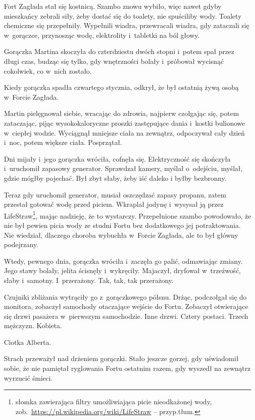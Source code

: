 \documentclass[oneside,polish,11pt,sfheadings]{mwbk}
\begin{document}
Fort Zagłada stał się kostnicą. Szambo znowu wybiło, więc nawet gdyby
mieszkańcy zebrali siły, żeby dostać się do toalety, nie spuściliby
wody. Toalety chemiczne się przepełniły. Wypełnili wiadra, przewracali
wiadra, gdy zataczali się w~gorączce, przynosząc wodę, elektrolity i~tabletki na ból głowy.

Gorączka Martina skoczyła do czterdziestu dwóch stopni i~potem spał przez długi
czas, budząc się tylko, gdy wnętrzności bolały i~próbował wycisnąć
cokolwiek, co w~nich zostało.

Kiedy gorączka spadła czwartego stycznia, odkrył, że był ostatnią żywą
osobą w~Forcie Zagłada.

Martin pielęgnował siebie, wracając do zdrowia, najpierw czołgając się,
potem zataczając, pijąc wysokokaloryczne proszki zastępujące dania i~kostki bulionowe w~ciepłej wodzie. Wyciągnął mniejsze ciała na zewnątrz,
odpoczywał cały dzień i~noc, potem większe ciała. Posprzątał.

Dni mijały i~jego gorączka wróciła, cofnęła się. Elektryczność się
skończyła i~uruchomił zapasowy generator. Sprawdzał kamery, myślał o~odejściu, myślał, gdzie mógłby pojechać. Był zbyt słaby, żeby iść daleko
i byłby bezbronny.

Teraz gdy uruchomił generator, musiał oszczędzać zapasy propanu, zatem
przestał gotować wodę przed piciem. Wkraplał jodynę i~wysysał ją przez
LifeStraw\footnote{ słomka zawierająca filtry umożliwiająca picie nieodkażonej
wody, zob.~\url{https://pl.wikipedia.org/wiki/LifeStraw} -- przyp.tłum.}, mając nadzieję, że to wystarczy. Przepełnione szambo
powodowało, że nie był pewien picia wody ze studni Fortu bez dodatkowego
jej potraktowania. Nie wiedział, dlaczego choroba wybuchła w~Forcie
Zagłada, ale to był główny podejrzany.

Wtedy, pewnego dnia, gorączka wróciła i~zaczęła go palić, odmawiając
zmiany. Jego stawy bolały, jelita ścisnęły i~wykręciły. Majaczył,
dryfował w~trzeźwość, słaby i~samotny. I~przerażony. Tak, tak, tak
przerażony.

Czujniki zbliżania wytrąciły go z~gorączkowego półsnu. Drżąc, podczołgał
się do monitora, zobaczył samochody otaczające wejście do Fortu.
Zobaczył otwierające się drzwi pasażera w~pierwszym samochodzie. Inne
drzwi. Cztery postaci. Trzech mężczyzn. Kobieta.

Ciotka Alberta.

Strach przeważył nad drżeniem gorączki. Stało jeszcze gorzej, gdy
uświadomił sobie, że nie pamiętał ryglowania Fortu ostatnim razem, gdy
wyszedł na zewnątrz wyrzucić śmieci.
\end{document}
